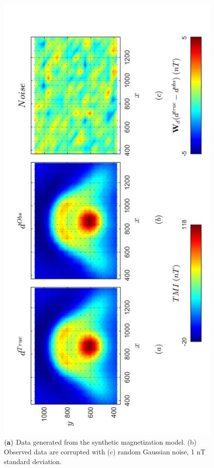 \begin{figure}[h!]
\centering
\includegraphics[scale=0.52, angle =270]{3D_Data_REMANENT.pdf}
\caption{ $\bf{(a)}$ Data generated from the synthetic magnetization model. (b) Observed data are corrupted with (c) random Gaussian noise, 1 nT standard deviation.}
\label{fig:3D_Data_REMANENT}
\end{figure}
